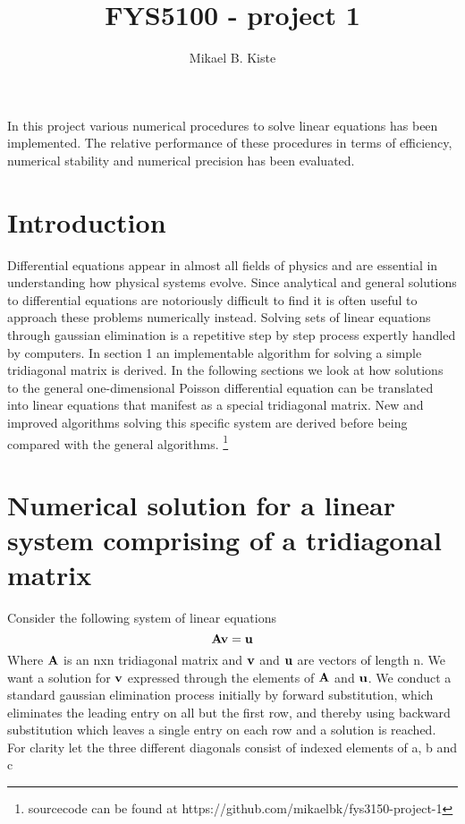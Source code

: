 \documentclass[10pt,a4paper]{article}
\author{Mikael B. Kiste}
\title{FYS5100 - project 1}
\begin{document}
    \maketitle

    \abstract In this project various numerical procedures to solve linear equations has been implemented. The relative performance of these procedures in terms of efficiency, numerical stability and numerical precision has been evaluated.

    \tableofcontents

    \newpage
    \section{Introduction}
    Differential equations appear in almost all fields of physics and are essential in understanding how physical systems evolve. Since analytical and general solutions to differential equations are notoriously difficult to find it is often useful to approach these problems numerically instead. Solving sets of linear equations through gaussian elimination is a repetitive step by step process expertly handled by computers. In section 1 an implementable algorithm for solving a simple tridiagonal matrix is derived. In the following sections we look at how solutions to the general one-dimensional Poisson differential equation can be translated into linear equations that manifest as a special tridiagonal matrix. New and improved algorithms solving this specific system are derived before being compared with the general algorithms. \footnote{sourcecode can be found at https://github.com/mikaelbk/fys3150-project-1}

	\newpage
    \section{Numerical solution for a linear system comprising of a tridiagonal matrix}
    Consider the following system of linear equations
	$$\vb{Av} = \vb{u}$$
	Where $\vb{A}$ is an nxn tridiagonal matrix and $\vb{v}$ and $\vb{u}$ are vectors of length n.
    We want a solution for $\vb{v}$ expressed through the elements of $\vb{A}$ and $\vb{u}$.
    We conduct a standard gaussian elimination process initially by forward substitution, which eliminates the leading entry on all but the first row, and thereby using backward substitution which leaves a single entry on each row and a solution is reached. For clarity let the three different diagonals consist of indexed elements of a, b and c
\end{document}
